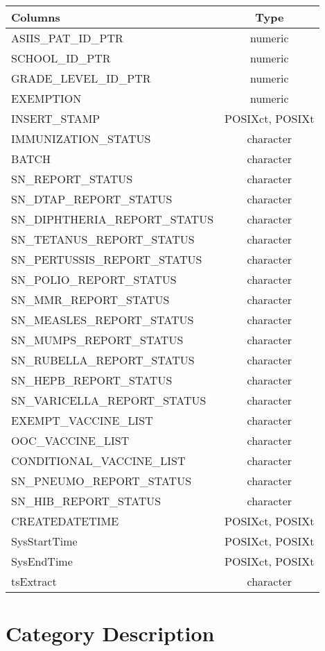 \documentclass[
  letterpaper,
  DIV=11,
  numbers=noendperiod]{scrreprt}
\begin{document}
\begin{longtable}{lc}
\toprule
Columns & Type \\ 
\midrule
ASIIS\_PAT\_ID\_PTR & numeric \\ 
SCHOOL\_ID\_PTR & numeric \\ 
GRADE\_LEVEL\_ID\_PTR & numeric \\ 
EXEMPTION & numeric \\ 
INSERT\_STAMP & POSIXct, POSIXt \\ 
IMMUNIZATION\_STATUS & character \\ 
BATCH & character \\ 
SN\_REPORT\_STATUS & character \\ 
SN\_DTAP\_REPORT\_STATUS & character \\ 
SN\_DIPHTHERIA\_REPORT\_STATUS & character \\ 
SN\_TETANUS\_REPORT\_STATUS & character \\ 
SN\_PERTUSSIS\_REPORT\_STATUS & character \\ 
SN\_POLIO\_REPORT\_STATUS & character \\ 
SN\_MMR\_REPORT\_STATUS & character \\ 
SN\_MEASLES\_REPORT\_STATUS & character \\ 
SN\_MUMPS\_REPORT\_STATUS & character \\ 
SN\_RUBELLA\_REPORT\_STATUS & character \\ 
SN\_HEPB\_REPORT\_STATUS & character \\ 
SN\_VARICELLA\_REPORT\_STATUS & character \\ 
EXEMPT\_VACCINE\_LIST & character \\ 
OOC\_VACCINE\_LIST & character \\ 
CONDITIONAL\_VACCINE\_LIST & character \\ 
SN\_PNEUMO\_REPORT\_STATUS & character \\ 
SN\_HIB\_REPORT\_STATUS & character \\ 
CREATEDATETIME & POSIXct, POSIXt \\ 
SysStartTime & POSIXct, POSIXt \\ 
SysEndTime & POSIXct, POSIXt \\ 
tsExtract & character \\ 
\bottomrule
\end{longtable}

\hypertarget{category-description-30}{%
\section*{Category Description}\label{category-description-30}}
\end{document}
